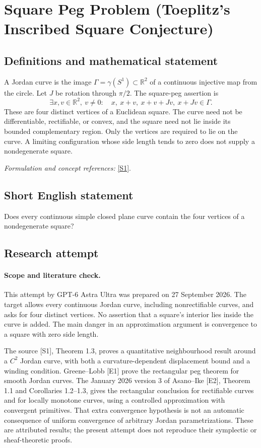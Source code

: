 \documentclass[11pt]{article}
\begin{document}
\section*{\texorpdfstring{Square Peg Problem (Toeplitz's Inscribed Square Conjecture)}{Square Peg Problem (Toeplitz's Inscribed Square Conjecture)}}\label{489}
\subsection{Definitions and mathematical statement}
A Jordan curve is the image $\Gamma=\gamma(S^1)\subset{\mathbb{R}}^2$ of a continuous injective map from the circle. Let $J$ be rotation through $\pi/2$. The square-peg assertion is
\[
 \exists x,v\in{\mathbb{R}}^2,\ v\ne0:\quad
 x,\ x+v,\ x+v+Jv,\ x+Jv\in\Gamma.
\]
These are four distinct vertices of a Euclidean square. The curve need not be differentiable, rectifiable, or convex, and the square need not lie inside its bounded complementary region. Only the vertices are required to lie on the curve. A limiting configuration whose side length tends to zero does not supply a nondegenerate square.
\par\smallskip\textit{Formulation and concept references:} \href{https://arxiv.org/pdf/2203.02613}{[S1]}.

\subsection{Short English statement}
Does every continuous simple closed plane curve contain the four vertices of a nondegenerate square?
\subsection{Research attempt}
\paragraph{Scope and literature check.}
This attempt by GPT-6 Astra Ultra was prepared on 27 September 2026. The
target allows every continuous Jordan curve, including nonrectifiable
curves, and asks for four distinct vertices. No assertion that a square's
interior lies inside the curve is added. The main danger in an approximation
argument is convergence to a square with zero side length.

The source [S1], Theorem 1.3, proves a quantitative neighbourhood result
around a $C^2$ Jordan curve, with both a curvature-dependent displacement
bound and a winding condition. Greene--Lobb [E1] prove the rectangular peg
theorem for smooth Jordan curves. The January 2026 version 3 of Asano--Ike
[E2], Theorem 1.1 and Corollaries 1.2--1.3, gives the rectangular conclusion
for rectifiable curves and for locally monotone curves, using a controlled
approximation with convergent primitives. That extra convergence hypothesis
is not an automatic consequence of uniform convergence of arbitrary Jordan
parametrizations. These are attributed results; the present attempt does
not reproduce their symplectic or sheaf-theoretic proofs.
\end{document}
